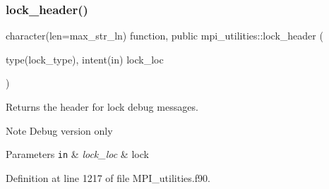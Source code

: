 \subsubsection{\texorpdfstring{lock\+\_\+header()}{lock\_header()}}
{\footnotesize\ttfamily character(len=max\+\_\+str\+\_\+ln) function, public mpi\+\_\+utilities\+::lock\+\_\+header (\begin{DoxyParamCaption}\item[{type(lock\+\_\+type), intent(in)}]{lock\+\_\+loc }\end{DoxyParamCaption})}



Returns the header for lock debug messages. 

\begin{DoxyNote}{Note}
Debug version only
\end{DoxyNote}

\begin{DoxyParams}[1]{Parameters}
\mbox{\tt in}  & {\em lock\+\_\+loc} & lock \\
\hline
\end{DoxyParams}


Definition at line 1217 of file M\+P\+I\+\_\+utilities.\+f90.

